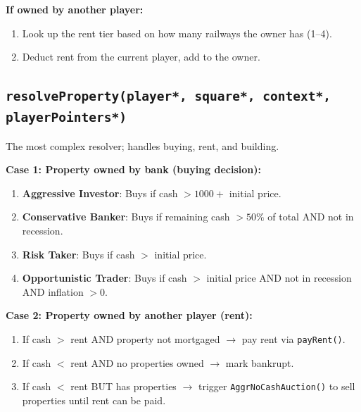 \documentclass[12pt,a4paper]{article}
\begin{document}
\textbf{If owned by another player:}
\begin{enumerate}[noitemsep]
    \item Look up the rent tier based on how many railways the owner has (1--4).
    \item Deduct rent from the current player, add to the owner.
\end{enumerate}

\subsection{\texttt{resolveProperty(player*, square*, context*, playerPointers*)}}
The most complex resolver; handles buying, rent, and building.

\textbf{Case 1: Property owned by bank (buying decision):}
\begin{enumerate}[noitemsep]
    \item \textbf{Aggressive Investor}: Buys if cash $> 1000 +$ initial price.
    \item \textbf{Conservative Banker}: Buys if remaining cash $> 50\%$ of total AND not in recession.
    \item \textbf{Risk Taker}: Buys if cash $>$ initial price.
    \item \textbf{Opportunistic Trader}: Buys if cash $>$ initial price AND not in recession AND inflation $> 0$.
\end{enumerate}

\textbf{Case 2: Property owned by another player (rent):}
\begin{enumerate}[noitemsep]
    \item If cash $>$ rent AND property not mortgaged $\rightarrow$ pay rent via \texttt{payRent()}.
    \item If cash $<$ rent AND no properties owned $\rightarrow$ mark bankrupt.
    \item If cash $<$ rent BUT has properties $\rightarrow$ trigger \texttt{AggrNoCashAuction()} to sell properties until rent can be paid.
\end{enumerate}
\end{document}
